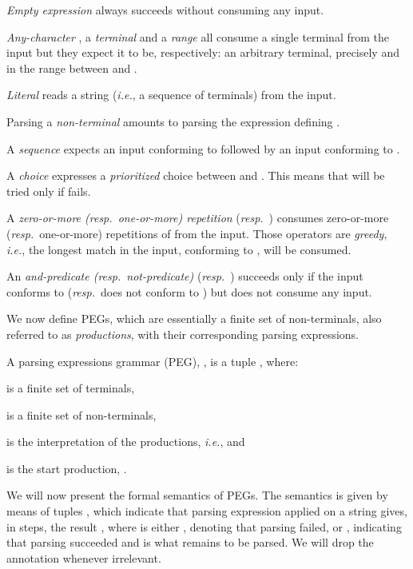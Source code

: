 \documentclass{LMCS}
\newcommand{\defqed}{\hfill\vspace{1ex}}
\newcommand{\ie}{\textit{i.e.}}
\newcommand{\resp}{\textit{resp.}}
\theoremstyle{definition}
\begin{document}
\begin{iteMize}{}
  \item \emph{Empty expression}  always succeeds without consuming 
    any input.
  \item \emph{Any-character} , a \emph{terminal}  and
    a \emph{range}  all consume a single terminal from the input but they expect
    it to be, respectively: an arbitrary terminal, precisely  and in the range
    between  and .
  \item \emph{Literal}  reads a string (\ie, a sequence of terminals)  from
    the input.
  \item Parsing a \emph{non-terminal}  amounts to parsing the expression 
    defining .
  \item A \emph{sequence}  expects an input conforming to 
     followed by an input conforming to .
  \item A \emph{choice}  expresses a \emph{prioritized} 
    choice between  and . This means that  will be tried only if
     fails.
  \item A \emph{zero-or-more (\resp\ one-or-more) repetition} 
     (\resp\ ) consumes zero-or-more (\resp\ one-or-more) 
    repetitions of  from the input. Those operators are \emph{greedy}, \ie,
    the longest match in the input, conforming to , will be consumed.
  \item An \emph{and-predicate (\resp\ not-predicate)}  (\resp\ ) 
    succeeds only if the input conforms to  (\resp\ does not conform to ) but does 
    not consume any input.
\end{iteMize}\medskip

\noindent We now define PEGs, which are essentially a finite set of
non-terminals, also referred to as \emph{productions}, with their
corresponding parsing expressions.

\begin{defi}\label{peg}
  A parsing expressions grammar (PEG), , is a tuple
, where:
\begin{iteMize}{}
  \item  is a finite set of terminals,
  \item  is a finite set of non-terminals,
  \item  is the interpretation of the productions, \ie,  and
  \item  is the start production, .  \defqed
\end{iteMize}
\end{defi}

We will now present the formal semantics of PEGs. 
The semantics is given by means of tuples , which indicate 
that parsing expression  applied on a string  gives,
in  steps, the result , where  is either , denoting that parsing failed, 
or , indicating that parsing succeeded and  is what remains to be 
parsed. We will drop the  annotation whenever irrelevant.
\end{document}
